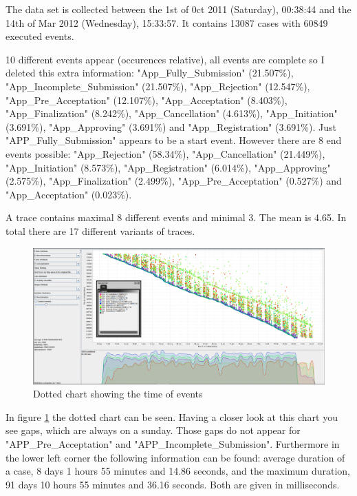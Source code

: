 The data set is collected between the 1st of 0ct 2011 (Saturday), 00:38:44 and the 14th of Mar 2012 (Wednesday), 15:33:57. It contains 13087 cases with 60849 executed events.

10 different events appear (occurences relative), all events are complete so I deleted this extra information: "App\_Fully\_Submission" (21.507\%), "App\_Incomplete\_Submission" (21.507\%), "App\_Rejection" (12.547\%), "App\_Pre\_Acceptation" (12.107\%), "App\_Acceptation" (8.403\%), "App\_Finalization" (8.242\%), "App\_Cancellation" (4.613\%), "App\_Initiation" (3.691\%), "App\_Approving" (3.691\%) and "App\_Registration" (3.691\%). Just "APP\_Fully\_Submission" appears to be a start event. However there are 8 end events possible: "App\_Rejection" (58.34\%), "App\_Cancellation" (21.449\%), "App\_Initiation" (8.573\%), "App\_Registration" (6.014\%), "App\_Approving" (2.575\%), "App\_Finalization" (2.499\%), "App\_Pre\_Acceptation" (0.527\%) and "App\_Acceptation" (0.023\%).


A trace contains maximal 8 different events and minimal 3. The mean is 4.65. In total there are 17 different variants of traces. 


\begin{figure}[!htbp]
\centering
\includegraphics[height = 0.2\textheight]{AppData.PNG}
\caption{Dotted chart showing the time of events}
\label{fig:AppTimeFlow}
\end{figure}

In figure \ref{fig:AppTimeFlow} the dotted chart can be seen. Having a closer look at this chart you see gaps, which are always on a sunday. Those gaps do not appear for "APP\_Pre\_Acceptation" and "APP\_Incomplete\_Submission". Furthermore in the lower left corner the following information can be found: average duration of a case, 8 days 1 hours 55 minutes and 14.86 seconds, and the maximum duration, 91 days 10 hours 55 minutes and 36.16 seconds. Both are given in milliseconds.


